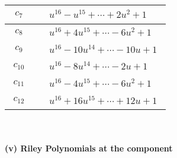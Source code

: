 \documentclass[1p]{elsarticle_modified}
\theoremstyle{definition}
\begin{document}
\begin{tabular}{m{50pt}|m{274pt}}
\hline $$\begin{aligned}c_{7}\end{aligned}$$&$\begin{aligned}
&u^{16}- u^{15}+\cdots+2 u^2+1
\end{aligned}$\\
\hline $$\begin{aligned}c_{8}\end{aligned}$$&$\begin{aligned}
&u^{16}+4 u^{15}+\cdots-6 u^2+1
\end{aligned}$\\
\hline $$\begin{aligned}c_{9}\end{aligned}$$&$\begin{aligned}
&u^{16}-10 u^{14}+\cdots-10 u+1
\end{aligned}$\\
\hline $$\begin{aligned}c_{10}\end{aligned}$$&$\begin{aligned}
&u^{16}-8 u^{14}+\cdots-2 u+1
\end{aligned}$\\
\hline $$\begin{aligned}c_{11}\end{aligned}$$&$\begin{aligned}
&u^{16}-4 u^{15}+\cdots-6 u^2+1
\end{aligned}$\\
\hline $$\begin{aligned}c_{12}\end{aligned}$$&$\begin{aligned}
&u^{16}+16 u^{15}+\cdots+12 u+1
\end{aligned}$\\
\hline
\end{tabular}\\~\\
\newpage\renewcommand{\arraystretch}{1}
\flushleft \textbf{(v) Riley Polynomials at the component}\newline \\
\end{document}
